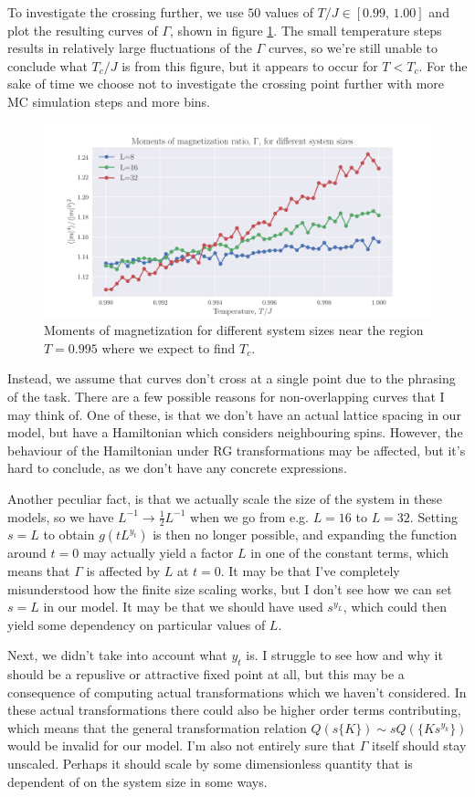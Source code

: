 \documentclass[reprint,english,notitlepage,aps,nobalancelastpage,nofootinbib]{revtex4-1}
\newcommand{\tj}{T/J}
\begin{document}
To investigate the crossing further, we use $50$ values of $\tj\in[0.99,\,1.00]$ and plot the resulting curves of $\Gamma$, shown in figure \ref{fig:gamma_dense}. The small temperature steps results in relatively large fluctuations of the $\Gamma$ curves, so we're still unable to conclude what $T_c/J$ is from this figure, but it appears to occur for $T<T_c$. For the sake of time we choose not to investigate the crossing point further with more MC simulation steps and more bins.   

\begin{figure}[h!]
	\centering
	\includegraphics[width=0.7\linewidth]{gamma_curves_N51_dT001.pdf}
	\caption{Moments of magnetization for different system sizes near the region $T=0.995$ where we expect to find $T_c$.}
	\label{fig:gamma_dense}
\end{figure}

Instead, we assume that curves don't cross at a single point due to the phrasing of the task. There are a few possible reasons for non-overlapping curves that I may think of. One of these, is that we don't have an actual lattice spacing in our model, but have a Hamiltonian which considers neighbouring spins. However, the behaviour of the Hamiltonian under RG transformations may be affected, but it's hard to conclude, as we don't have any concrete expressions. 

Another peculiar fact, is that we actually scale the size of the system in these models, so we have $L^{-1}\to \frac{1}{2}L^{-1}$ when we go from e.g. $L=16$ to $L=32$. Setting $s=L$ to obtain $g(tL^{y_t})$ is then no longer possible, and expanding the function around $t=0$ may actually yield a factor $L$ in one of the constant terms, which means that $\Gamma$ is affected by $L$ at $t=0$. It may be that I've completely misunderstood how the finite size scaling works, but I don't see how we can set $s=L$ in our model. It may be that we should have used $s^{y_L}$, which could then yield some dependency on particular values of $L$. 

Next, we didn't take into account what $y_t$ is. I struggle to see how and why it should be a repuslive or attractive fixed point at all, but this may be a consequence of computing actual transformations which we haven't considered. In these actual transformations there could also be higher order terms contributing, which means that the general transformation relation $Q(s\{K\})\sim sQ(\{Ks^{y_k}\})$ would be invalid for our model. I'm also not entirely sure that $\Gamma$ itself should stay unscaled. Perhaps it should scale by some dimensionless quantity that is dependent of on the system size in some ways.  
\end{document}
